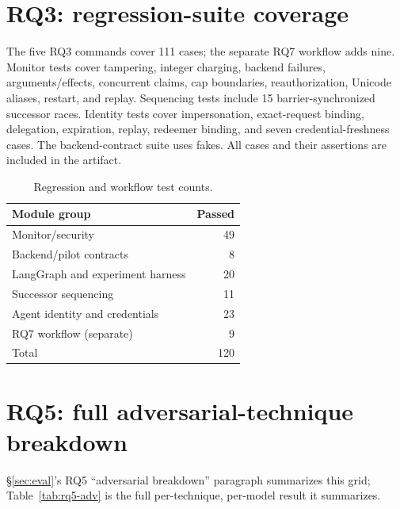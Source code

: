 \documentclass[conference,compsoc]{IEEEtran}
\begin{document}
\section{RQ3: regression-suite coverage}
\label{app:rq3}
The five RQ3 commands cover 111 cases; the separate RQ7 workflow adds nine.
Monitor tests cover tampering, integer charging, backend failures, arguments/effects, concurrent claims, cap boundaries, reauthorization, Unicode aliases, restart, and replay. Sequencing tests include 15 barrier-synchronized successor races. Identity tests cover impersonation, exact-request binding, delegation, expiration, replay, redeemer binding, and seven credential-freshness cases. The backend-contract suite uses fakes. All cases and their assertions are included in the artifact.
\begin{table}[h]
\centering
\caption{Regression and workflow test counts.}
\begin{tabular}{lr}
\hline
Module group & Passed \\
\hline
Monitor/security & 49 \\
Backend/pilot contracts & 8 \\
LangGraph and experiment harness & 20 \\
Successor sequencing & 11 \\
Agent identity and credentials & 23 \\
RQ7 workflow (separate) & 9 \\
\hline
Total & 120 \\
\hline
\end{tabular}
\end{table}

\section{RQ5: full adversarial-technique breakdown}
\label{app:rq5-adv}
\S\ref{sec:eval}'s RQ5 ``adversarial breakdown'' paragraph summarizes
this grid; Table~\ref{tab:rq5-adv} is the full per-technique,
per-model result it summarizes.
\end{document}
